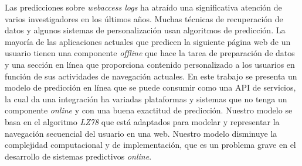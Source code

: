 {Las predicciones sobre \emph{webaccess logs} ha atraído una significativa atención de varios investigadores en los últimos años. Muchas técnicas de recuperación de datos y algunos sistemas de personalización usan algoritmos de predicción. La mayoría de las aplicaciones actuales que predicen la siguiente página web de un usuario tienen una componente  \emph{offline} que hace la tarea de preparación de datos y una sección en línea que proporciona contenido personalizado a los usuarios en función de sus actividades de navegación actuales. En este trabajo se presenta un modelo de predicción en línea que se puede consumir como una API de servicios, la cual da una integración ha variadas plataformas y sistemas que  no tenga un componente \emph{online} y con una buena exactitud de predicción. Nuestro modelo se basa en el algoritmo \emph{LZ78} que está adaptados para modelar y representar la navegación secuencial del usuario en una web. Nuestro modelo disminuye la complejidad computacional  y de implementación, que es un problema grave en el desarrollo de sistemas predictivos \emph{online}.





  }








% 

